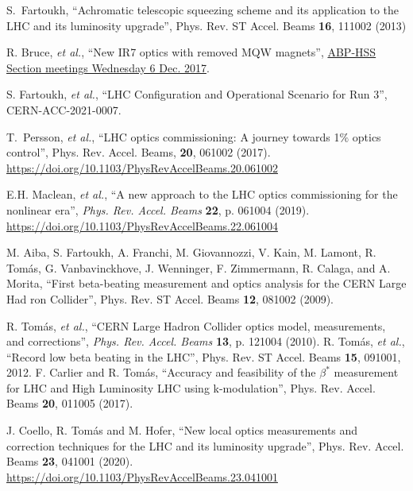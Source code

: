 \documentclass[a4paper]{cernatsnote}
\begin{document}
\begin{thebibliography}{99}   %

S.~Fartoukh, ``Achromatic telescopic squeezing scheme and its application to the LHC and its luminosity upgrade'', Phys. Rev. ST Accel. Beams {\bf16}, 111002 (2013)

 R. Bruce, {\it et al.}, ``New IR7 optics with removed
MQW magnets'',  \href{https://indico.cern.ch/event/681507/contributions/2814548/attachments/1570845/2478033/2017.12.06--HSS_meeting_MQW_removal.pdf}{ABP-HSS Section meetings
Wednesday 6 Dec. 2017}.

 S. Fartoukh, {\it et al.}, 
	``LHC Configuration and Operational Scenario for Run 3'', CERN-ACC-2021-0007.

 T.~Persson, {\it et al.}, ``LHC optics commissioning: A journey towards 1$\%$ optics control'', Phys. Rev. Accel. Beams, \textbf{20}, 061002 (2017).
\url{https://doi.org/10.1103/PhysRevAccelBeams.20.061002}

 E.H. Maclean, {\it et al.}, ``A new approach to the LHC optics commissioning for the nonlinear era'', {\it Phys. Rev. Accel. Beams}  {\bf 22}, p. 061004 (2019).\vspace{-0.03cm}
\url{https://doi.org/10.1103/PhysRevAccelBeams.22.061004}


	


 M. Aiba, S. Fartoukh, A. Franchi, M. Giovannozzi, V. Kain, M. Lamont, R. Tom\'as, G. Vanbavinckhove, J. Wenninger, F. Zimmermann, R. Calaga, and A. Morita, ``First beta-beating measurement and optics analysis for the CERN Large Had ron Collider'', Phys. Rev. ST Accel. Beams {\bf12}, 081002 (2009).


R. Tomás, {\it et al.}, “CERN Large Hadron Collider optics
model, measurements, and corrections”, {\it Phys. Rev. Accel. Beams}  {\bf 13}, p. 121004 (2010).
%
 R. Tom\'as, {\it et al.}, ``Record low beta beating in the LHC'',
Phys. Rev. ST Accel. Beams {\bf15}, 091001, 2012.
%
 F. Carlier and R. Tom\'as, ``Accuracy and feasibility of the $\beta^*$ measurement for LHC and High Luminosity LHC using k-modulation'',
Phys. Rev. Accel. Beams {\bf20}, 011005 (2017).
%


J. Coello, R. Tom\'as and M. Hofer, ``New local optics measurements and correction techniques for the LHC and its luminosity upgrade'', Phys. Rev. Accel. Beams {\bf 23}, 041001 (2020).
\url{https://doi.org/10.1103/PhysRevAccelBeams.23.041001}


\end{thebibliography}
\end{document}
